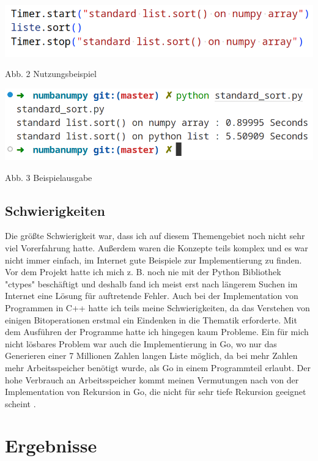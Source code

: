 \documentclass[10pt,a4paper]{article}
\begin{document}
\begin{center}
    \includegraphics[width=.75\textwidth]{screenshots/timerexamplelight.png}
    
    Abb. 2 Nutzungsbeispiel
    
    \includegraphics[width=.75\textwidth]{screenshots/outputexamplelight.png}

    Abb. 3 Beispielausgabe
\end{center}

\subsection{Schwierigkeiten}

Die größte Schwierigkeit war, dass ich auf diesem Themengebiet noch nicht sehr viel Vorerfahrung hatte.
Außerdem waren die Konzepte teils komplex und es war nicht immer einfach, im Internet gute Beispiele zur Implementierung
zu finden. Vor dem Projekt hatte ich mich z. B. noch nie mit der Python Bibliothek "ctypes" beschäftigt und deshalb fand
ich meist erst nach längerem Suchen im Internet eine Lösung für auftretende Fehler.
Auch bei der Implementation von Programmen in C++ hatte ich teils meine Schwierigkeiten, da das Verstehen
von einigen Bitoperationen erstmal ein Eindenken in die Thematik erforderte.
Mit dem Ausführen der Programme hatte ich hingegen kaum Probleme.
Ein für mich nicht lösbares Problem war auch die Implementierung in Go, wo nur das Generieren
einer 7 Millionen Zahlen langen Liste möglich, da bei mehr Zahlen mehr Arbeitsspeicher benötigt wurde,
als Go in einem Programmteil erlaubt. Der hohe Verbrauch an Arbeitsspeicher kommt meinen Vermutungen
nach von der Implementation von Rekursion in Go, die nicht für sehr tiefe Rekursion geeignet scheint
\cite{godeeprecursions} \cite{goroutinesize}.

\clearpage

\section{Ergebnisse}
\end{document}
